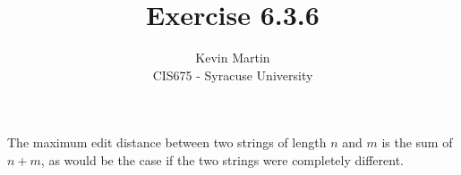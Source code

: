 \documentclass{article}
\author{Kevin Martin\\ CIS675 - Syracuse University}
\title{Exercise 6.3.6}
\begin{document}
\maketitle
The maximum edit distance between two strings of length $n$ and $m$
is the sum of $n + m$, as would be the case if the two strings were
completely different.
\end{document}
